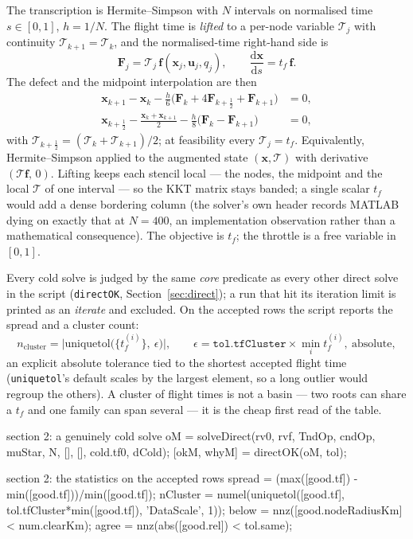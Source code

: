 \documentclass[11pt]{article}
\newcommand{\tf}{t_f}\newcommand{\R}{\mathbb{R}}
\newcommand{\file}[1]{\texttt{#1}}
\newcommand{\Tl}{\mathcal{T}}
\begin{document}
\begin{rig}
The transcription is Hermite--Simpson with $N$ intervals on normalised time
$s\in[0,1]$, $h=1/N$. The flight time is \emph{lifted} to a per-node
variable $\Tl_j$ with continuity $\Tl_{k+1}=\Tl_k$, and the normalised-time
right-hand side is
\[
\bm F_j=\Tl_j\,\bm f(\bm x_j,\bm u_j,q_j),\qquad
\frac{\mathrm d\bm x}{\mathrm ds}=\tf\,\bm f .
\]
The defect and the midpoint interpolation are then
\begin{align*}
\bm x_{k+1}-\bm x_k-\frac{h}{6}\big(\bm F_k+4\bm F_{k+\frac12}+\bm F_{k+1}\big)&=0,\\
\bm x_{k+\frac12}-\frac{\bm x_k+\bm x_{k+1}}{2}-\frac{h}{8}\big(\bm F_k-\bm F_{k+1}\big)&=0,
\end{align*}
with $\Tl_{k+\frac12}=(\Tl_k+\Tl_{k+1})/2$; at feasibility every $\Tl_j=\tf$.
Equivalently, Hermite--Simpson applied to the augmented state $(\bm x,\Tl)$
with derivative $(\Tl\bm f,\,0)$. Lifting keeps each stencil local --- the
nodes, the midpoint and the local $\Tl$ of one interval --- so the KKT matrix
stays banded; a single scalar $\tf$ would add a dense bordering column (the
solver's own header records MATLAB dying on exactly that at $N=400$, an
implementation observation rather than a mathematical consequence). The
objective is $\tf$; the throttle is a free variable in $[0,1]$.

Every cold solve is judged by the same \emph{core} predicate as every other
direct solve in the script (\file{directOK}, Section~\ref{sec:direct}); a run that hit its
iteration limit is printed as an \emph{iterate} and excluded. On the
accepted rows the script reports the spread and a cluster count:
\[
n_{\mathrm{cluster}}=\big|\mathrm{uniquetol}\big(\{\tf^{(i)}\},\ \epsilon\big)\big|,\qquad
\epsilon=\texttt{tol.tfCluster}\times\min_i \tf^{(i)},\ \text{absolute},
\]
an explicit absolute tolerance tied to the shortest accepted flight time
(\file{uniquetol}'s default scales by the largest element, so a long outlier
would regroup the others). A cluster of flight times is not a basin --- two
roots can share a $\tf$ and one family can span several --- it is the cheap
first read of the table.
\end{rig}

\begin{snippet}{section 2: a genuinely cold solve}
oM = solveDirect(rv0, rvf, TndOp, cndOp, muStar, N, [], [], cold.tf0, dCold);
[okM, whyM] = directOK(oM, tol);
\end{snippet}
\begin{snippet}{section 2: the statistics on the accepted rows}
spread   = (max([good.tf]) - min([good.tf]))/min([good.tf]);
nCluster = numel(uniquetol([good.tf], tol.tfCluster*min([good.tf]), 'DataScale', 1));
below    = nnz([good.nodeRadiusKm] < num.clearKm);
agree    = nnz(abs([good.rel]) < tol.same);           %
\end{snippet}
\end{document}

